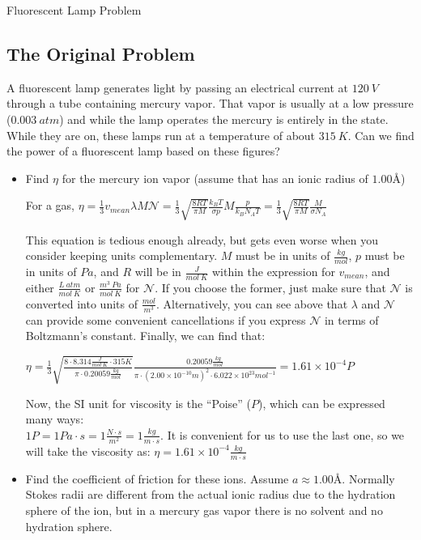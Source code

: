 \documentclass[11pt, letterpaper]{memoir}
\begin{document}
	\begin{center}
		{\large Fluorescent Lamp Problem}
	\end{center}

		
\subsection*{The Original Problem}
A fluorescent lamp generates light by passing an electrical current at $120~V$ through a tube containing mercury vapor. That vapor is usually at a low pressure ($0.003~atm$) and while the lamp operates the mercury is entirely in the  state. While they are on, these lamps run at a temperature of about $315~K$. Can we find the power of a fluorescent lamp based on these figures?
\begin{itemize}
	\item Find $\eta$ for the mercury ion vapor (assume that  has an ionic radius of $1.00$\AA)
	
	For a gas, $\eta=\frac{1}{3}v_{mean}\lambda M\mathcal{N}=\frac{1}{3}\sqrt{\frac{8RT}{\pi M}}\frac{k_BT}{\sigma p}M\frac{p}{k_BN_AT}=\frac{1}{3}\sqrt{\frac{8RT}{\pi M}}\frac{M}{\sigma N_A}$
	
	This equation is tedious enough already, but gets even worse when you consider keeping units complementary. $M$ must be in units of $\frac{kg}{mol}$, $p$ must be in units of $Pa$, and $R$ will be in $\frac{J}{mol~K}$ within the expression for $v_{mean}$, and either $\frac{L~atm}{mol~K}$ or $\frac{m^3~Pa}{mol~K}$ for $\mathcal{N}$. If you choose the former, just make sure that $\mathcal{N}$ is converted into units of $\frac{mol}{m^3}$. Alternatively, you can see above that $\lambda$ and $\mathcal{N}$ can provide some convenient cancellations if you express $\mathcal{N}$ in terms of Boltzmann's constant. Finally, we can find that:
	
	$\eta = \frac{1}{3}\sqrt{\frac{8\cdot8.314\frac{J}{mol~K}\cdot315K}{\pi\cdot0.20059\frac{kg}{mol}}}\frac{0.20059\frac{kg}{mol}}{\pi\cdot \left(2.00\times10^{-10}m\right)^2 \cdot 6.022\times10^{23} mol^{-1}}=1.61\times10^{-4}P$
	
	Now, the SI unit for viscosity is the ``Poise'' ($P$), which can be expressed many ways: \\$1P=1Pa\cdot s = 1\frac{N\cdot s}{m^2}=1\frac{kg}{m\cdot s}$. It is convenient for us to use the last one, so we will take the viscosity as: $\eta=1.61\times10^{-4}\frac{kg}{m\cdot s}$

	\item Find the coefficient of friction for these ions. Assume $a\approx 1.00$\AA. Normally Stokes radii are different from the actual ionic radius due to the hydration sphere of the ion, but in a mercury gas vapor there is no solvent and no hydration sphere.
	

\end{itemize}
\end{document}
